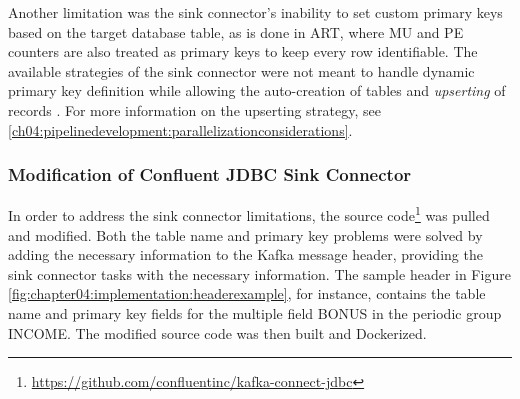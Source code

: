 Another limitation was the sink connector's inability to set custom primary keys based on the target database table, as is done in \ac{ART}, where MU and PE counters are also treated as primary keys to keep every row identifiable. The available strategies of the sink connector were not meant to handle dynamic primary key definition while allowing the auto-creation of tables and \textit{upserting} of records \cite{jdbcsinkdocumentation}. For more information on the upserting strategy, see \ref{ch04:pipelinedevelopment:parallelizationconsiderations}.

\subsubsection{Modification of Confluent JDBC Sink Connector}
In order to address the sink connector limitations, the source code\footnote{\url{https://github.com/confluentinc/kafka-connect-jdbc}} was pulled and modified. Both the table name and primary key problems were solved by adding the necessary information to the Kafka message header, providing the sink connector tasks with the necessary information. The sample header in Figure \ref{fig:chapter04:implementation:headerexample}, for instance, contains the table name and primary key fields for the multiple field BONUS in the periodic group INCOME. The modified source code was then built and Dockerized.

